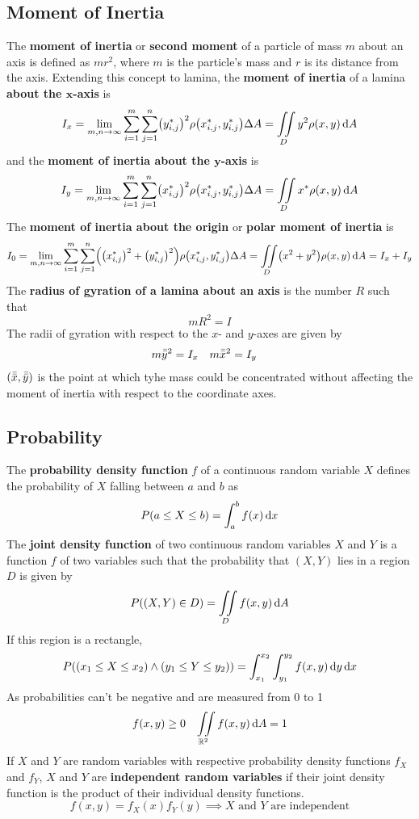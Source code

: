 \documentclass[../Calculus \Roman{3}.tex]{subfiles}
\begin{document}
		\subsection*{Moment of Inertia}
			The \textbf{moment of inertia} or \textbf{second moment} of a particle of mass $m$ about an axis is defined as $mr^2$, where $m$ is the particle's mass and $r$ is its distance from the axis. Extending this concept to lamina, the \textbf{moment of inertia} of a lamina \textbf{about the $\bm{x}$-axis} is
				\[
					I_x = \lim_{m, n \to \infty}\sum_{i = 1}^m\sum_{j = 1}^n\bigl(y_{i, j}^*\bigr)^2\rho\bigl(x_{i, j}^*, y_{i, j}^*\bigr)\Delta A
							= \iint\limits_D y^2\rho(x, y)\,\mathrm{d} A
				\]
				and the \textbf{moment of inertia about the $\bm{y}$-axis} is
					\[
						I_y = \lim_{m, n \to \infty}\sum_{i = 1}^m\sum_{j = 1}^n\bigl(x_{i, j}^*\bigr)^2\rho\bigl(x_{i, j}^*, y_{i, j}^*\bigr)\Delta A
								= \iint\limits_D x^*\rho(x, y)\,\mathrm{d} A
					\]
			The \textbf{moment of inertia about the origin} or \textbf{polar moment of inertia} is
				\[
					I_0 = \lim_{m, n \to \infty}\sum_{i = 1}^m\sum_{j = 1}^n\Bigl(\bigl(x_{i, j}^*\bigr)^2 + \bigl(y_{i, j}^*\bigr)^2\Bigr)\rho\bigl(x_{i, j}^*, y_{i, j}^*\bigr)\Delta A
							= \iint\limits_D \bigl(x^2 + y^2\bigr)\rho(x, y)\,\mathrm{d} A
							= I_x + I_y
				\]
			The \textbf{radius of gyration of a lamina about an axis} is the number $R$ such that
				\[mR^2 = I\]
				The radii of gyration with respect to the $x$- and $y$-axes are given by
					\begin{align*}
						m\bar{\bar{y}}^2 &= I_x &
								m\bar{\bar{x}}^2 &= I_y
					\end{align*}
					$(\bar{\bar{x}}, \bar{\bar{y}})$ is the point at which tyhe mass could be concentrated without affecting the moment of inertia with respect to the coordinate axes.
		\subsection*{Probability}
			The \textbf{probability density function} $f$ of a continuous random variable $X$ defines the probability of $X$ falling between $a$ and $b$ as
				\[P(a \le X \le b) = \int_a^b f(x)\,\mathrm{d} x\]
				The \textbf{joint density function} of two continuous random variables $X$ and $Y$ is a function $f$ of two variables such that the probability that $(X, Y)$ lies in a region $D$ is given by
					\[P((X, Y) \in D) = \iint\limits_D f(x, y)\,\mathrm{d} A\]
				If this region is a rectangle,
					\[P((x_1 \le X \le x_2) \land (y_1 \le Y \le y_2)) = \int_{x_1}^{x_2}\int_{y_1}^{y_2} f(x, y)\,\mathrm{d} y\,\mathrm{d} x\]
				As probabilities can't be negative and are measured from 0 to 1
					\begin{align*}
						f(x, y) &\ge 0 &
							\iint\limits_{\mathbb{R}^2} f(x, y)\,\mathrm{d} A = 1
					\end{align*}
			If $X$ and $Y$ are random variables with respective probability density functions $f_X$ and $f_Y$, $X$ and $Y$ are \textbf{independent random variables} if their joint density function is the product of their individual density functions.
				\[f(x, y) = f_X(x)f_Y(y) \implies \text{$X$ and $Y$ are independent}\]
\end{document}
